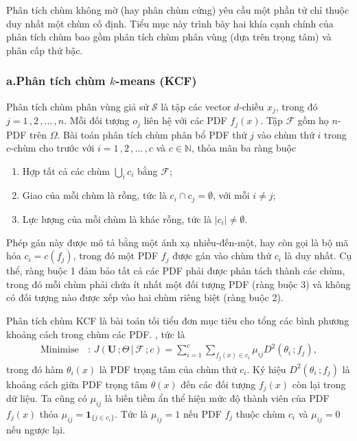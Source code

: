 \documentclass[a4paper,oneside]{book} %
\theoremstyle{plain}
\theoremstyle{plain}
\theoremstyle{nonumberplain}
\begin{document}
Phân tích chùm không mờ (hay phân chùm cứng) yêu cầu một phần tử chỉ thuộc duy nhất một chùm cố định. Tiểu mục này trình bày hai khía cạnh chính của phân tích chùm bao gồm phân tích chùm phân vùng (dựa trên trọng tâm) và phân cấp thứ bậc. 



\subsubsection{a.\quad Phân tích chùm $k$-means (KCF)}

Phân tích chùm phân vùng giả sử $\mathcal{S}$ là tập các vector $d$-chiều $x_j$, trong đó $j=1\,,2\,,\ldots\,,n$. Mỗi đối tượng $o_j$ liên hệ với các PDF $f_j(x)$. Tập $\mathcal{F}$ gồm họ $n$-PDF trên $\Omega$. Bài toán phân tích chùm phân bổ PDF thứ $j$ vào chùm thứ $i$ trong $c$-chùm cho trước với $i=1\,,2\,,\ldots\,,c$ và $c\in\mathbb{N}$, thỏa mãn ba ràng buộc
\begin{enumerate}
	\item Hợp tất cả các chùm $\bigcup_i c_i$ bằng $\mathcal{F}$;
	\item Giao của mỗi chùm là rỗng, tức là $c_i\cap c_j =\emptyset$, với mỗi $i\ne j$;
	\item Lực lượng của mỗi chùm là khác rỗng, tức là $|c_i|\ne \emptyset$.
\end{enumerate}

Phép gán này được mô tả bằng một ánh xạ nhiều-đến-một, hay còn gọi là bộ mã hóa $c_i=c(f_j)$, trong đó một PDF $f_j$ được gán vào chùm thứ $c_i$ là duy nhất. Cụ thể, ràng buộc 1 đảm bảo tất cả các PDF phải được phân tách thành các chùm, trong đó mỗi chùm phải chứa ít nhất một đối tượng PDF (ràng buộc 3) và không có đối tượng nào được xếp vào hai chùm riêng biệt (ràng buộc 2). 

Phân tích chùm KCF là bài toán tối tiểu đơn mục tiêu cho tổng các bình phương khoảng cách trong chùm các PDF. \cite{macqueen1967some,Tai2010,nguyen2024new}, tức là
\begin{align}\tag{KCF}\label{Jk}
	\text{Minimise}\,&:\, J(\bm U\,; \Theta\,|\, \mathcal{F}\,;c) = \sum_{i=1}^{c}\sum_{f_j(x)\in c_i}\mu_{ij}{D}^2(\theta_i\,;{f}_j),
\end{align}
 trong đó hàm $\theta_i(x)$ là PDF trọng tâm của chùm thứ $c_i$. Ký hiệu $
{D}^2(\theta_i\,;{f}_j)$ là khoảng cách giữa PDF trọng tâm $\theta(x)$ đến các đối tượng $f_j(x)$ còn lại trong dữ liệu. 
Ta cũng có $\mu_{ij}$ là biến tiềm ẩn thể hiện mức độ thành viên của PDF $f_j(x)$ thỏa $\mu_{ij}= \bm 1_{\{j\in c_i\}}$. Tức là $\mu_{ij} =1$ nếu PDF $f_j$ thuộc chùm $c_i$ và $\mu_{ij}=0$ nếu ngược lại. 
\end{document}
